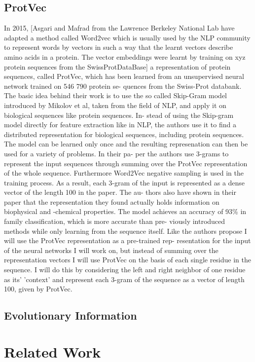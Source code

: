 \documentclass{article}
\begin{document}
\subsection{ProtVec}
In 2015, [Asgari and Mafrad from the Lawrence Berkeley National Lab have
adapted a method called Word2vec which is usually used by the NLP community to represent words by vectors in such a way that the learnt vectors describe amino acids in a protein. The vector embeddings were learnt by training on xyz protein sequences from the SwissProtDataBase] a representation of protein sequences, called ProtVec, which has been
learned from an unsupervised neural network trained on 546 790 protein se-
quences from the Swiss-Prot databank. The basic idea behind their work is to
use the so called Skip-Gram model introduced by Mikolov et al, taken from the
field of NLP, and apply it on biological sequences like protein sequences. In-
stead of using the Skip-gram model directly for feature extraction like in NLP,
the authors use it to find a distributed representation for biological sequences,
including protein sequences. The model can be learned only once and the
resulting represenation can then be used for a variety of problems. In their pa-
per the authors use 3-grams to represent the input sequences through summing
over the ProtVec representation of the whole sequence. Furthermore Word2Vec
negative sampling is used in the training process. As a result, each 3-gram of the
input is represented as a dense vector of the length 100 in the paper. The au-
thors also have shown in their paper that the representation they found actually
holds information on biophysical and -chemical properties. The model achieves an accuracy of 93\% in family classification, which is more accurate than pre-
viously introduced methods while only learning from the sequence itself. Like
the authors propose I will use the ProtVec representation as a pre-trained rep-
resentation for the input of the neural networks I will work on, but instead
of summing over the representation vectors I will use ProtVec on the basis of
each single residue in the sequence. I will do this by considering the left and
right neighbor of one residue as its’ ’context’ and represent each 3-gram of the
sequence as a vector of length 100, given by ProtVec.
\subsection{Evolutionary Information}

\section{Related Work}
\end{document}
